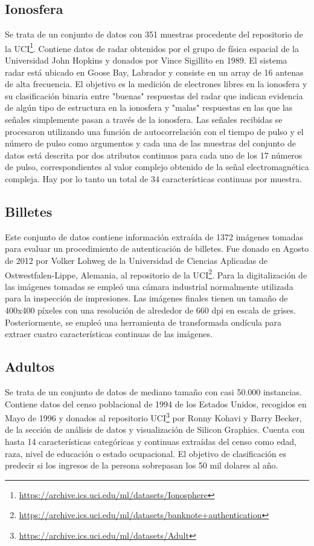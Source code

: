 \subsection{Ionosfera}

Se trata de un conjunto de datos con 351 muestras procedente del repositorio de la UCI\footnote{\url{https://archive.ics.uci.edu/ml/datasets/Ionosphere}}. Contiene datos de radar obtenidos por el grupo de física espacial de la Universidad John Hopkins y donados por Vince Sigillito en 1989. El sistema radar está ubicado en Goose Bay, Labrador y consiste en un array de 16 antenas de alta frecuencia. El objetivo es la medición de electrones libres en la ionosfera y su clasificación binaria entre "buenas" respuestas del radar que indican evidencia de algún tipo de estructura en la ionosfera y "malas" respuestas en las que las señales simplemente pasan a través de la ionosfera. Las señales recibidas se procesaron utilizando una función de autocorrelación con el tiempo de pulso y el número de pulso como argumentos y cada una de las muestras del conjunto de datos está descrita por dos atributos continuos para cada uno de los 17 números de pulso, correspondientes al valor complejo obtenido de la señal electromagnética compleja. Hay por lo tanto un total de 34 características continuas por muestra.

\subsection{Billetes}

Este conjunto de datos contiene información extraída de 1372 imágenes tomadas para evaluar un procedimiento de autenticación de billetes. Fue donado en Agosto de 2012 por Volker Lohweg de la Universidad de Ciencias Aplicadas de Ostwestfalen-Lippe, Alemania, al repositorio de la UCI\footnote{\url{https://archive.ics.uci.edu/ml/datasets/banknote+authentication}}. Para la digitalización de las imágenes tomadas se empleó una cámara industrial normalmente utilizada para la inspección de impresiones. Las imágenes finales tienen un tamaño de 400x400 píxeles con una resolución de alrededor de 660 dpi en escala de grises. Posteriormente, se empleó una herramienta de transformada ondícula para extraer cuatro características continuas de las imágenes.

\subsection{Adultos}

Se trata de un conjunto de datos de mediano tamaño con casi 50.000 instancias. Contiene datos del censo poblacional de 1994 de los Estados Unidos, recogidos en Mayo de 1996 y donados al repositorio UCI\footnote{\url{https://archive.ics.uci.edu/ml/datasets/Adult}} por Ronny Kohavi y Barry Becker, de la sección de análisis de datos y visualización de Silicon Graphics. Cuenta con hasta 14 características categóricas y continuas extraídas del censo como edad, raza, nivel de educación o estado ocupacional. El objetivo de clasificación es predecir si los ingresos de la persona sobrepasan los 50 mil dolares al año.
